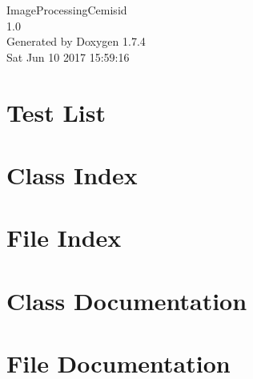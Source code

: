 \documentclass[a4paper]{book}
\begin{document}
\hypersetup{pageanchor=false}
\begin{titlepage}
\vspace*{7cm}
\begin{center}
{\Large ImageProcessingCemisid \\[1ex]\large 1.0 }\\
\vspace*{1cm}
{\large Generated by Doxygen 1.7.4}\\
\vspace*{0.5cm}
{\small Sat Jun 10 2017 15:59:16}\\
\end{center}
\end{titlepage}
\clearemptydoublepage
{}
\tableofcontents
\clearemptydoublepage
{}
\hypersetup{pageanchor=true}
\chapter{Test List}
\label{test}
\hypertarget{test}{}

\chapter{Class Index}

\chapter{File Index}

\chapter{Class Documentation}


\chapter{File Documentation}


















\printindex
\end{document}
